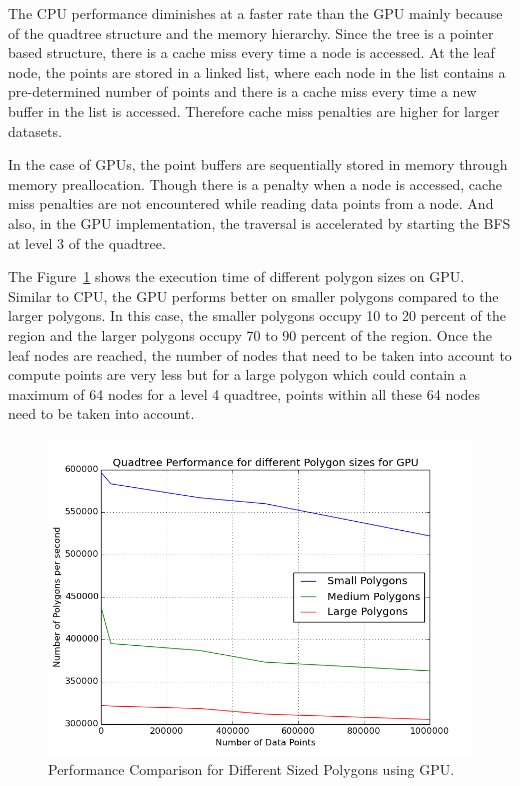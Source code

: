 The CPU performance diminishes at a faster rate than the GPU mainly because of the quadtree structure and the memory hierarchy. Since the tree is a pointer based structure, there is a cache miss every time a node is accessed. At the leaf node, the points are stored in a linked list, where each node in the list contains a pre-determined number of points and there is a cache miss every time a new buffer in the list is accessed. Therefore cache miss penalties are higher for larger datasets.

In the case of GPUs, the point buffers are sequentially stored in memory through memory preallocation. Though there is a penalty when a node is accessed, cache miss penalties are not encountered while reading data points from a node. And also, in the GPU implementation, the traversal is accelerated by starting the BFS at level 3 of the quadtree.

The Figure~\ref{fig:Different_Sized_Polygon_GPU4} shows the execution time of different polygon sizes on GPU. Similar to CPU, the GPU performs better on smaller polygons compared to the larger polygons.
In this case, the smaller polygons occupy 10 to 20 percent of the region  and the larger polygons occupy 70 to 90 percent of the region. Once the leaf nodes are reached, the number of nodes that need to be taken into account to compute points are very less  but for a large polygon which could contain a maximum of 64 nodes for a level 4 quadtree, points within all these 64 nodes need to be taken into account.

\begin{figure}[H]
\centering
\vspace{0.5in}
\includegraphics[scale=0.5]{Images/Different_Sized_Polygon_GPU4}
\vspace{0.5in}
\caption{Performance Comparison for Different Sized Polygons using GPU.}
\label{fig:Different_Sized_Polygon_GPU4}
\end{figure}

